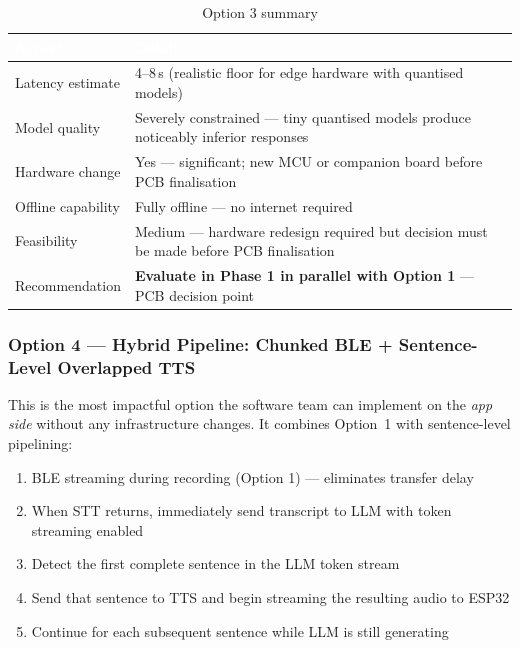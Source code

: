 \documentclass[12pt,a4paper]{article}
\begin{document}
\begin{table}[h!]
\centering
\renewcommand{\arraystretch}{1.3}
\begin{tabularx}{\linewidth}{|l|X|}
\hline
\rowcolor{primary}
\textcolor{white}{\textbf{Aspect}} & \textcolor{white}{\textbf{Detail}} \\
\hline
Latency estimate     & 4--8\,s (realistic floor for edge hardware with quantised models) \\
\hline
\rowcolor{rowalt}
Model quality        & Severely constrained — tiny quantised models produce noticeably inferior responses \\
\hline
Hardware change      & Yes — significant; new MCU or companion board before PCB finalisation \\
\hline
\rowcolor{rowalt}
Offline capability   & Fully offline — no internet required \\
\hline
Feasibility          & Medium — hardware redesign required but decision must be made before PCB finalisation \\
\hline
\rowcolor{rowalt}
Recommendation       & \textbf{Evaluate in Phase 1 in parallel with Option 1} — PCB decision point \\
\hline
\end{tabularx}
\caption{Option 3 summary}
\end{table}

\subsubsection{Option 4 — Hybrid Pipeline: Chunked BLE + Sentence-Level Overlapped TTS}

This is the most impactful option the software team can implement on the \emph{app side} without
any infrastructure changes. It combines Option~1 with sentence-level pipelining:

\begin{enumerate}
  \item BLE streaming during recording (Option 1) — eliminates transfer delay
  \item When STT returns, immediately send transcript to LLM with token streaming enabled
  \item Detect the first complete sentence in the LLM token stream
  \item Send that sentence to TTS and begin streaming the resulting audio to ESP32
  \item Continue for each subsequent sentence while LLM is still generating
\end{enumerate}
\end{document}
